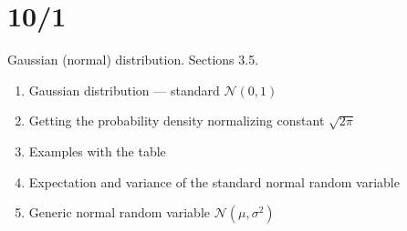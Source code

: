 \documentclass[letterpaper,11pt,oneside,reqno]{amsart}
\numberwithin{equation}{section}
\theoremstyle{definition}
\begin{document}
\section{10/1}

Gaussian (normal) distribution. Sections 3.5.
\begin{enumerate}
	\item Gaussian distribution --- standard $\mathcal{N}(0,1)$
	\item Getting the probability density normalizing constant $\sqrt{2\pi}$
	\item Examples with the table
	\item Expectation and variance of the standard normal random variable
	\item Generic normal random variable $\mathcal{N}(\mu,\sigma^2)$
\end{enumerate}


%
\end{document}
